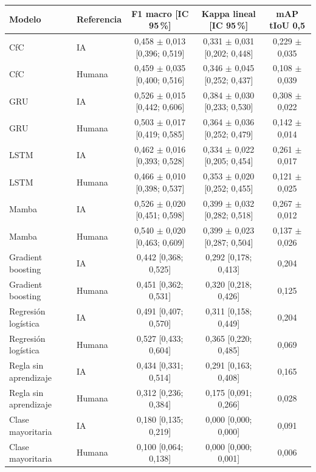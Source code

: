 \begin{tabular}{|l|l|c|c|c|}
\hline
\textbf{Modelo} & \textbf{Referencia} & \textbf{F1 macro [IC 95\,\%]} & \textbf{Kappa lineal [IC 95\,\%]} & \textbf{mAP tIoU 0{,}5} \\ \hline
CfC & IA & 0{,}458 $\pm$ 0{,}013 [0{,}396; 0{,}519] & 0{,}331 $\pm$ 0{,}031 [0{,}202; 0{,}448] & 0{,}229 $\pm$ 0{,}035 \\ \hline
CfC & Humana & 0{,}459 $\pm$ 0{,}035 [0{,}400; 0{,}516] & 0{,}346 $\pm$ 0{,}045 [0{,}252; 0{,}437] & 0{,}108 $\pm$ 0{,}039 \\ \hline
GRU & IA & 0{,}526 $\pm$ 0{,}015 [0{,}442; 0{,}606] & 0{,}384 $\pm$ 0{,}030 [0{,}233; 0{,}530] & 0{,}308 $\pm$ 0{,}022 \\ \hline
GRU & Humana & 0{,}503 $\pm$ 0{,}017 [0{,}419; 0{,}585] & 0{,}364 $\pm$ 0{,}036 [0{,}252; 0{,}479] & 0{,}142 $\pm$ 0{,}014 \\ \hline
LSTM & IA & 0{,}462 $\pm$ 0{,}016 [0{,}393; 0{,}528] & 0{,}334 $\pm$ 0{,}022 [0{,}205; 0{,}454] & 0{,}261 $\pm$ 0{,}017 \\ \hline
LSTM & Humana & 0{,}466 $\pm$ 0{,}010 [0{,}398; 0{,}537] & 0{,}353 $\pm$ 0{,}020 [0{,}252; 0{,}455] & 0{,}121 $\pm$ 0{,}025 \\ \hline
Mamba & IA & 0{,}526 $\pm$ 0{,}020 [0{,}451; 0{,}598] & 0{,}399 $\pm$ 0{,}032 [0{,}282; 0{,}518] & 0{,}267 $\pm$ 0{,}012 \\ \hline
Mamba & Humana & 0{,}540 $\pm$ 0{,}020 [0{,}463; 0{,}609] & 0{,}399 $\pm$ 0{,}023 [0{,}287; 0{,}504] & 0{,}137 $\pm$ 0{,}026 \\ \hline
Gradient boosting & IA & 0{,}442 [0{,}368; 0{,}525] & 0{,}292 [0{,}178; 0{,}413] & 0{,}204 \\ \hline
Gradient boosting & Humana & 0{,}451 [0{,}362; 0{,}531] & 0{,}320 [0{,}218; 0{,}426] & 0{,}125 \\ \hline
Regresión logística & IA & 0{,}491 [0{,}407; 0{,}570] & 0{,}311 [0{,}158; 0{,}449] & 0{,}204 \\ \hline
Regresión logística & Humana & 0{,}527 [0{,}433; 0{,}604] & 0{,}365 [0{,}220; 0{,}485] & 0{,}069 \\ \hline
Regla sin aprendizaje & IA & 0{,}434 [0{,}331; 0{,}514] & 0{,}291 [0{,}163; 0{,}408] & 0{,}165 \\ \hline
Regla sin aprendizaje & Humana & 0{,}312 [0{,}236; 0{,}384] & 0{,}175 [0{,}091; 0{,}266] & 0{,}028 \\ \hline
Clase mayoritaria & IA & 0{,}180 [0{,}135; 0{,}219] & 0{,}000 [0{,}000; 0{,}000] & 0{,}091 \\ \hline
Clase mayoritaria & Humana & 0{,}100 [0{,}064; 0{,}138] & 0{,}000 [0{,}000; 0{,}001] & 0{,}006 \\ \hline
\end{tabular}
